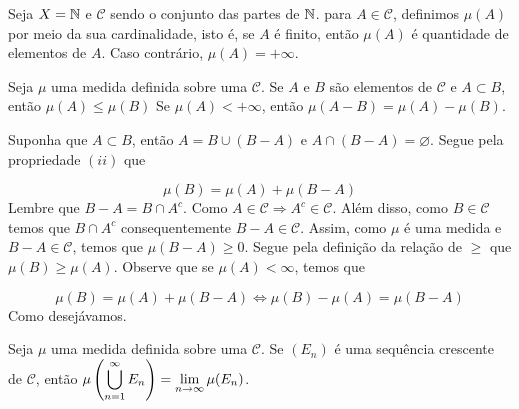 \begin{example}
    Seja $X = \operatorname{\mathbb{N}}$ e $\mathcal{C}$ sendo o conjunto das partes de $\operatorname{\mathbb{N}}$. 
para $A \in \mathcal{C}$, definimos $\mu(A)$ por meio da sua cardinalidade, isto é, se $A$ é finito, então $\mu(A)$ é quantidade de elementos de $A$. Caso contrário, $\mu(A) = +\infty$.

\end{example}





\begin{theorem}
\label{teo:operacoes-com-medidas-1}
	Seja $\mu$ uma medida definida sobre uma \sigal $\mathcal{C}$.
	Se $A$ e $B$ são elementos de $\mathcal{C}$ e $A \subset B$, então $\mu(A) \leq \mu(B)$
	Se $\mu(A) < +\infty$, então $\mu(A-B) = \mu(A) - \mu(B)$.
\end{theorem}

\begin{prova}
	Suponha que $A \subset B$, então $A = B \cup (B - A)$ e $A \cap (B - A) = \varnothing$. Segue pela propriedade $(ii)$ que 
	
	$$\mu(B) = \mu(A) + \mu(B-A)$$
 Lembre que $B-A = B\cap A^c$. Como $A \in \mathcal{C} \Rightarrow A^c \in \mathcal{C}$.
 Além disso, como $B \in \mathcal{C}$ temos que $ B\cap A^c$ consequentemente $B - A \in \mathcal{C}$.
 Assim, como $\mu$ é uma medida e $B-A \in \mathcal{C}$, temos que $\mu(B-A) \geq 0$.
 Segue pela definição da relação de $\geq$ que $\mu(B) \geq \mu(A)$.
 Observe que se $\mu(A) < \infty$, temos que 

	$$\mu(B) = \mu(A) + \mu(B-A) 
 \Leftrightarrow \mu(B) - \mu(A) =  \mu(B-A)
 $$
Como desejávamos.
\end{prova}

\begin{proposition}
\label{prop:limite-sequencia-crescente}
Seja $\mu$ uma medida definida sobre uma \sigal $\mathcal{C}$.
Se $(E_n)$ é uma sequência crescente de $\mathcal{C}$, então $\mu\left(\displaystyle \bigcup_{n = 1}^\infty E_n\right) = \displaystyle \lim_{n \to \infty} \mu(E_n)$.
\end{proposition} 

